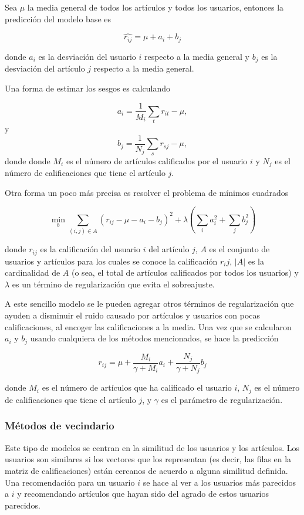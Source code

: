 Sea $\mu$ la media general de todos los artículos y todos los usuarios, entonces la predicción del modelo base es

\[
\hat{r_{ij}} = \mu + a_i + b_j
\]

donde $a_i$ es la desviación del usuario $i$ respecto a la media general y $b_j$ es la desviación del artículo $j$ respecto a la media general.

Una forma de estimar los sesgos es calculando

\[
a_i = \frac{1}{M_i} \sum_t r_{it} - \mu,
\]
y 
\[
b_j = \frac{1}{N_j} \sum_s r_{sj} - \mu,
\]
donde donde $M_i$ es el número de artículos calificados por el usuario $i$ y $N_j$ es el número de calificaciones que tiene el artículo $j$.

Otra forma un poco más precisa es resolver el problema de mínimos cuadrados

\[
\min_{b} \sum_{(i, j) \in A} \left( r_{ij} - \mu - a_i - b_j \right) ^2 + \lambda \left( \sum_{i} a_i^2 + \sum_{j} b_j^2 \right)
\]

donde $r_{ij}$ es la calificación del usuario $i$ del artículo $j$, $A$ es el conjunto de usuarios y artículos para los cuales se conoce la calificación $r_ij$, $ \vert A \vert$ es la cardinalidad de $A$ (o sea, el total de artículos calificados por todos los usuarios) y $\lambda$ es un término de regularización que evita el sobreajuste.

A este sencillo modelo se le pueden agregar otros términos de regularización que ayuden a disminuir el ruido causado por artículos y usuarios con pocas calificaciones, al encoger las calificaciones a la media. Una vez que se calcularon $a_i$ y $b_j$ usando cualquiera de los métodos mencionados, se hace la predicción

\begin{equation}
  \label{ec:modelo_base}
  r_{ij} = \mu + \frac{M_i}{\gamma + M_i} a_i + \frac{N_j}{\gamma + N_j}b_j
\end{equation}

donde $M_i$ es el número de artículos que ha calificado el usuario $i$, $N_j$ es el número de calificaciones que tiene el artículo $j$, y $\gamma$ es el parámetro de regularización.

\subsubsection{Métodos de vecindario}

Este tipo de modelos se centran en la similitud de los usuarios y los artículos. Los usuarios son similares si los vectores que los representan (es decir, las filas en la matriz de calificaciones) están cercanos de acuerdo a alguna similitud definida. Una recomendación para un usuario $i$ se hace al ver a los usuarios más parecidos a $i$ y recomendando artículos que hayan sido del agrado de estos usuarios parecidos.

